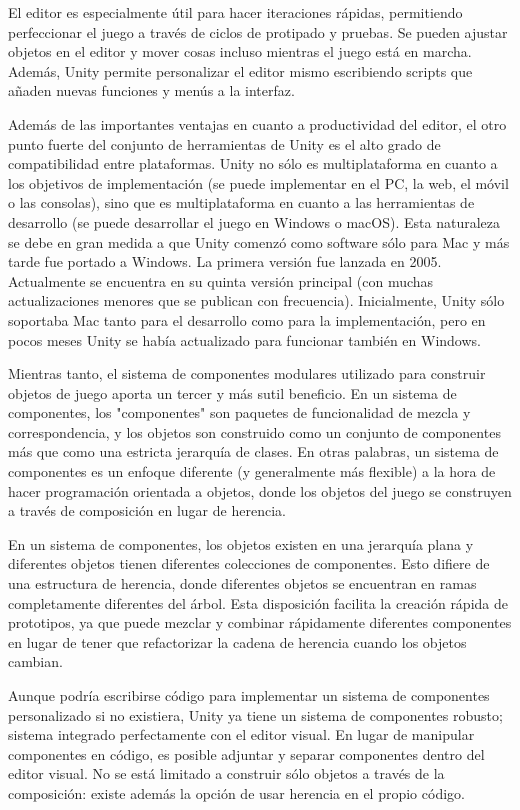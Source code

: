 El editor es especialmente útil para hacer iteraciones rápidas, permitiendo perfeccionar el juego a través de ciclos de protipado y pruebas. Se pueden ajustar objetos en el editor y mover cosas incluso mientras el juego está en marcha. Además, Unity permite personalizar el editor mismo escribiendo scripts que añaden nuevas funciones y menús a la interfaz.

Además de las importantes ventajas en cuanto a productividad del editor, el otro punto fuerte del conjunto de herramientas de Unity es el alto grado de compatibilidad entre plataformas. Unity no sólo es multiplataforma en cuanto a los objetivos de implementación (se puede implementar en el PC, la web, el móvil o las consolas), sino que es multiplataforma en cuanto a las herramientas de desarrollo (se puede desarrollar el juego en Windows o macOS). Esta naturaleza se debe en gran medida a que Unity comenzó como software sólo para Mac y más tarde fue portado a Windows. La primera versión fue lanzada en 2005. Actualmente se encuentra en su quinta versión principal (con muchas actualizaciones menores que se publican con frecuencia). Inicialmente, Unity sólo soportaba Mac tanto para el desarrollo como para la implementación, pero en pocos meses Unity se había actualizado para funcionar también en Windows.

Mientras tanto, el sistema de componentes modulares utilizado para construir objetos de juego aporta un tercer y más sutil beneficio. En un sistema de componentes, los "componentes" son paquetes de funcionalidad de mezcla y correspondencia, y los objetos son construido como un conjunto de componentes más que como una estricta jerarquía de clases. En otras palabras, un sistema de componentes es un enfoque diferente (y generalmente más flexible) a la hora de hacer programación orientada a objetos, donde los objetos del juego se construyen a través de composición en lugar de herencia.

En un sistema de componentes, los objetos existen en una jerarquía plana y diferentes objetos tienen diferentes colecciones de componentes. Esto difiere de una estructura de herencia, donde diferentes objetos se encuentran en ramas completamente diferentes del árbol. Esta disposición facilita la creación rápida de prototipos, ya que puede mezclar y combinar rápidamente diferentes componentes en lugar de tener que refactorizar la cadena de herencia cuando los objetos cambian.

Aunque podría escribirse código para implementar un sistema de componentes personalizado si no existiera, Unity ya tiene un sistema de componentes robusto; sistema integrado perfectamente con el editor visual. En lugar de manipular componentes en código, es posible adjuntar y separar componentes dentro del editor visual. No se está limitado a construir sólo objetos a través de la composición: existe además la opción de usar herencia en el propio código.

